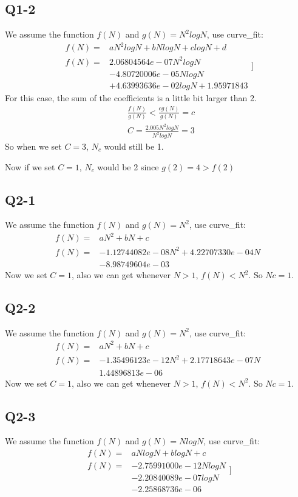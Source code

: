 \documentclass[conference]{IEEEtran}
\begin{document}
\subsection*{Q1-2}
We assume the function $f(N)$ and $g(N)=N^2logN$, use curve\_fit:
\[\begin{aligned}
    f(N)=&aN^2logN+bNlogN+clogN+d\\
    f(N)=&2.06804564e-07N^2logN\\
    &-4.80720006e-05NlogN\\
    &+4.63993636e-02logN+1.95971843
\end{aligned}]\]
For this case, the sum of the coefficients is a little bit larger than 2.
\[\begin{aligned}
    &\frac{f(N)}{g(N)}<\frac{cg(N)}{g(N)}=c\\
    &C=\frac{2.005N^2logN}{N^2logN}=3
\end{aligned}\]
So when we set $C=3$, $N_c$ would still be 1.

Now if we set $C=1$, $N_c$ would be 2 since $g(2)=4>f(2)$

\subsection*{Q2-1}
We assume the function $f(N)$ and $g(N)=N^2$, use curve\_fit:
\[\begin{aligned}
    f(N)=&aN^2+bN+c\\
    f(N)=&-1.12744082e-08N^2+4.22707330e-04N\\
    &-8.98749604e-03
\end{aligned}\]
Now we set $C=1$, also we can get whenever $N>1$, $f(N)<N^2$. So $Nc=1$.
\subsection*{Q2-2}
We assume the function $f(N)$ and $g(N)=N^2$, use curve\_fit:
\[\begin{aligned}
    f(N)=&aN^2+bN+c\\
    f(N)=&-1.35496123e-12N^2+2.17718643e-07N\\
    &1.44896813e-06
\end{aligned}\]
Now we set $C=1$, also we can get whenever $N>1$, $f(N)<N^2$. So $Nc=1$.
\subsection*{Q2-3}
We assume the function $f(N)$ and $g(N)=NlogN$, use curve\_fit:
\[\begin{aligned}
    f(N)=&aNlogN+blogN+c\\
    f(N)=&-2.75991000e-12NlogN\\
    &-2.20840089e-07logN\\
    &-2.25868736e-06
\end{aligned}]\]
\end{document}
